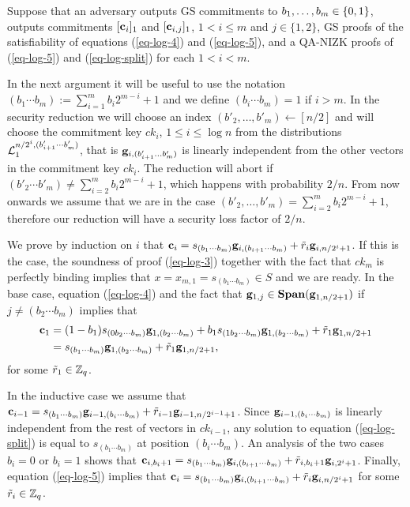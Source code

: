 Suppose that an adversary outputs GS commitments to $b_1,\ldots,b_{m}\in\{0,1\}$, outputs commitments $[\mathbf{c}_i]_1$ and $[\mathbf{c}_{i,j}]_1$, $1< i\leq m$ and $j\in\{1,2\}$, GS proofs of the satisfiability of equations (\ref{eq-log-4}) and (\ref{eq-log-5}), and a QA-NIZK proofs of (\ref{eq-log-5}) and (\ref{eq-log-split}) for each $1<i<m$.

In the next argument it will be useful to use the notation $(b_1\cdots b_m):=\sum_{i=1}^{m}b_i2^{m-i}+1$ and we define $(b_i\cdots b_m)=1$ if $i>m$.
In the security reduction we will choose an index $(b'_2,\ldots,b'_m)\gets[n/2]$ and will choose the commitment key $ck_i$, $1\leq i \leq \log n$ from the distributions $\mathcal{L}_1^{n/2^i,(b'_{i+1}\cdots b'_m)}$, that is $\mathbf{g}_{i,(b'_{i+1}\ldots b'_m)}$ is linearly independent from the other vectors in the commitment key $ck_i$. The reduction will abort if $(b'_2\cdots b'_m)\neq\sum_{i=2}^{m} b_i2^{m-i}+1$, which happens with probability $2/n$. From now onwards we assume that we are in the case $(b'_2,\ldots,b'_m)=\sum_{i=2}^{m} b_i2^{m-i}+1$, therefore our reduction will have a security loss factor of $2/n$.

We prove by induction on $i$ that $\mathbf{c}_i=s_{(b_1\cdots b_m)}\mathbf{g}_{i,(b_{i+1}\cdots b_m)}+\tilde{r}_i\mathbf{g}_{i,n/2^i+1}$. If this is the case, the soundness of proof (\ref{eq-log-3}) together with the fact that $ck_m$ is perfectly binding implies that $x=x_{m,1}=s_{(b_1\cdots b_m)}\in S$ and we are ready. In the base case, equation (\ref{eq-log-4}) and the fact that $\mathbf{g}_{1,j}\in\mathbf{Span}(\mathbf{g}_{1,n/2+1})$ if $j\neq (b_2\cdots b_m)$ implies that 
\begin{align*}
\mathbf{c}_1 &= (1-b_1)s_{(0b_2\cdots b_m)} \mathbf{g}_{1,(b_2\cdots b_m)}+b_1s_{(1b_2\cdots b_m)}\mathbf{g}_{1,(b_2\cdots b_m)}+\tilde{r}_1\mathbf{g}_{1,n/2+1}\\
&=s_{(b_1\cdots b_m)}\mathbf{g}_{1,(b_2\cdots b_m)}+\tilde{r}_1\mathbf{g}_{1,n/2+1},
\end{align*} for some $\tilde{r}_1\in\mathbb{Z}_q$.

In the inductive case we assume that $\mathbf{c}_{i-1}=s_{(b_1\cdots b_m)}\mathbf{g}_{i-1,(b_i\cdots b_m)}+\tilde{r}_{i-1}\mathbf{g}_{i-1,n/2^{i-1}+1}$. Since $\mathbf{g}_{i-1,(b_i\cdots b_m)}$ is linearly independent from the rest of vectors in $ck_{i-1}$, any solution to equation (\ref{eq-log-split}) is equal to $s_{(b_1\cdots b_m)}$ at position $(b_i\cdots b_m)$. An analysis of the two cases $b_i=0$ or $b_i=1$ shows that $\mathbf{c}_{i,b_i+1}=s_{(b_1\cdots b_m)}\mathbf{g}_{i,(b_{i+1}\cdots b_m)}+\tilde{r}_{i,b_i+1}\mathbf{g}_{i,2^i+1}$. Finally, equation (\ref{eq-log-5}) implies that $\mathbf{c}_i=s_{(b_1\cdots b_m)}\mathbf{g}_{i,(b_{i+1}\cdots b_m)}+\tilde{r}_i\mathbf{g}_{i,n/2^i+1}$ for some $\tilde{r}_{i}\in\mathbb{Z}_q$.

